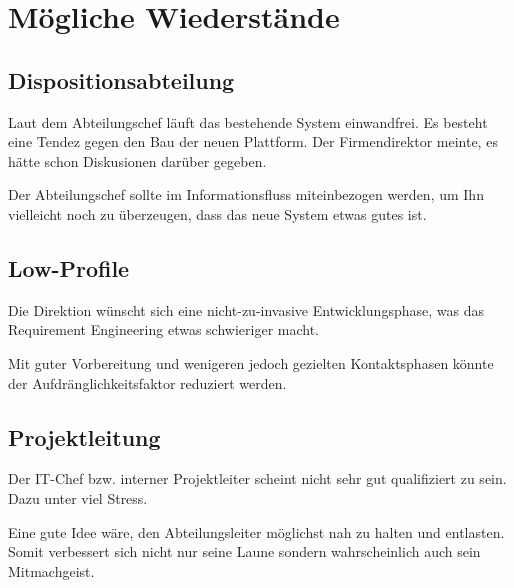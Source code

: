 \section{Mögliche Wiederstände}

  \subsection{Dispositionsabteilung}
  Laut dem Abteilungschef läuft das bestehende System einwandfrei. Es besteht eine Tendez gegen den Bau der neuen Plattform.
  Der Firmendirektor meinte, es hätte schon Diskusionen darüber gegeben.
  
  Der Abteilungschef sollte im Informationsfluss miteinbezogen werden, um Ihn vielleicht noch zu überzeugen, dass das neue System etwas gutes ist.
  
  \subsection{Low-Profile}
  Die Direktion wünscht sich eine nicht-zu-invasive Entwicklungsphase, was das Requirement Engineering etwas schwieriger macht.
  
  Mit guter Vorbereitung und wenigeren jedoch gezielten Kontaktsphasen könnte der Aufdränglichkeitsfaktor reduziert werden. 
  
  \subsection{Projektleitung}
  Der IT-Chef bzw. interner Projektleiter scheint nicht sehr gut qualifiziert zu sein. Dazu unter viel Stress.
  
  Eine gute Idee wäre, den Abteilungsleiter möglichst nah zu halten und entlasten.
  Somit verbessert sich nicht nur seine Laune sondern wahrscheinlich auch sein Mitmachgeist. 
